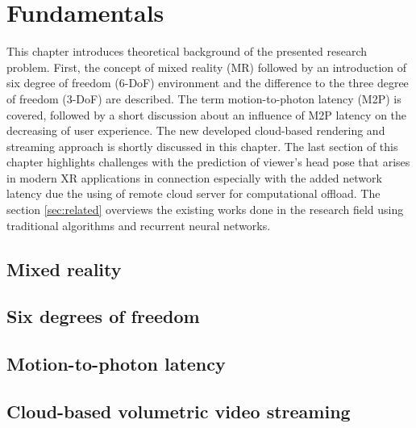 
\chapter{Fundamentals}
\label{sec:theorie}
This chapter introduces theoretical background of the presented research problem. First, the concept of mixed reality (MR) followed by an introduction of six degree of freedom (6-DoF) environment and the difference to the three degree of freedom (3-DoF) are described. The term motion-to-photon latency (M2P) is covered, followed by a short discussion about an influence of M2P latency on the decreasing of user experience. The new developed cloud-based rendering and streaming approach is shortly discussed in this chapter. The last section of this chapter highlights challenges with the prediction of viewer's head pose that arises in modern XR applications in connection especially with the added network latency due the using of remote cloud server for computational offload. The section \ref{sec:related} overviews the existing works done in the research field using traditional algorithms and recurrent neural networks. 

\section{Mixed reality}
\label{sec:theorie:ar}

\section{Six degrees of freedom}
\label{sec:theorie:6dof} 

\section{Motion-to-photon latency}
\label{sec:theorie:m2p}

\section{Cloud-based volumetric video streaming}
\label{sec:theorie:cloud}

